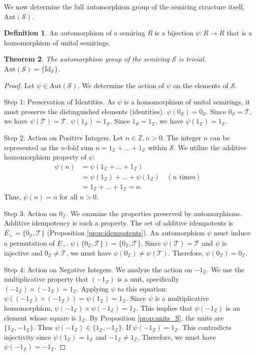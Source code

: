 \documentclass[11pt, a4paper]{article}
\theoremstyle{plain}
\newtheorem{theorem}{Theorem}[section]
\theoremstyle{definition}
\newtheorem{definition}[theorem]{Definition}
\numberwithin{equation}{section}
\newcommand{\Z}{\mathbb{Z}}
\newcommand{\Tobj}{\mathcal{T}} %
\newcommand{\SemiringS}{\mathcal{S}}
\newcommand{\Aut}{\mathrm{Aut}}
\newcommand{\Id}{\mathrm{Id}}
\begin{document}
We now determine the full automorphism group of the semiring structure itself, $\Aut(\SemiringS)$.

\begin{definition}
An automorphism of a semiring $R$ is a bijection $\psi: R \to R$ that is a homomorphism of unital semirings.
\end{definition}

\begin{theorem}\label{thm:aut_S_trivial}
The automorphism group of the semiring $\SemiringS$ is trivial. $\Aut(\SemiringS) = \{\Id_{\SemiringS}\}$.
\end{theorem}
\begin{proof}
Let $\psi \in \Aut(\SemiringS)$. We determine the action of $\psi$ on the elements of $\SemiringS$.

Step 1: Preservation of Identities.
As $\psi$ is a homomorphism of unital semirings, it must preserve the distinguished elements (identities).
$\psi(0_{\SemiringS}) = 0_{\SemiringS}$. Since $0_{\SemiringS}=\Tobj$, we have $\psi(\Tobj)=\Tobj$.
$\psi(1_{\SemiringS}) = 1_{\SemiringS}$. Since $1_{\SemiringS}=1_{\Z}$, we have $\psi(1_{\Z})=1_{\Z}$.

Step 2: Action on Positive Integers.
Let $n \in \Z, n>0$. The integer $n$ can be represented as the $n$-fold sum $n = 1_{\Z}+\dots+1_{\Z}$ within $\SemiringS$.
We utilize the additive homomorphism property of $\psi$:
\begin{align*}
    \psi(n) &= \psi(1_{\Z}+\dots+1_{\Z}) \\
    &= \psi(1_{\Z})+\dots+\psi(1_{\Z}) \quad (n \text{ times}) \\
    &= 1_{\Z}+\dots+1_{\Z} = n.
\end{align*}
Thus, $\psi(n)=n$ for all $n>0$.

Step 3: Action on $0_{\Z}$.
We examine the properties preserved by automorphisms. Additive idempotency is such a property.
The set of additive idempotents is $E_+ = \{0_{\Z}, \Tobj\}$ (Proposition \ref{prop:idempotents}).
An automorphism $\psi$ must induce a permutation of $E_+$. $\psi(\{0_{\Z}, \Tobj\}) = \{0_{\Z}, \Tobj\}$.
Since $\psi(\Tobj)=\Tobj$ and $\psi$ is injective and $0_{\Z} \neq \Tobj$, we must have $\psi(0_{\Z}) \neq \psi(\Tobj)$.
Therefore, $\psi(0_{\Z})=0_{\Z}$.

Step 4: Action on Negative Integers.
We analyze the action on $-1_{\Z}$. We use the multiplicative property that $(-1_{\Z})$ is a unit, specifically $(-1_{\Z})\times(-1_{\Z})=1_{\Z}$.
Applying $\psi$ to this equation:
$\psi((-1_{\Z})\times(-1_{\Z})) = \psi(1_{\Z}) = 1_{\Z}$.
Since $\psi$ is a multiplicative homomorphism, $\psi(-1_{\Z})\times\psi(-1_{\Z}) = 1_{\Z}$.
This implies that $\psi(-1_{\Z})$ is an element whose square is $1_{\Z}$. By Proposition \ref{prop:units_S}, the units are $\{1_{\Z}, -1_{\Z}\}$. Thus $\psi(-1_{\Z}) \in \{1_{\Z}, -1_{\Z}\}$.
If $\psi(-1_{\Z})=1_{\Z}$. This contradicts injectivity since $\psi(1_{\Z})=1_{\Z}$ and $-1_{\Z} \neq 1_{\Z}$.
Therefore, we must have $\psi(-1_{\Z})=-1_{\Z}$.


\end{proof}
\end{document}
